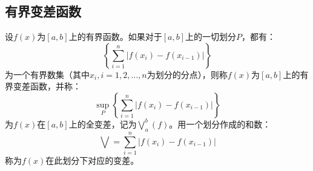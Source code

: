 \subsection{有界变差函数}
\begin{definition}
	设$f(x)$为$[a,b]$上的有界函数。如果对于$[a,b]$上的一切划分$P$，都有：
	\begin{equation*}
		\left\{\sum_{i=1}^{n}|f(x_i)-f(x_{i-1})|\right\}
	\end{equation*}
	为一个有界数集（其中$x_i,i=1,2,\dots,n$为划分的分点），则称$f(x)$为$[a,b]$上的有界变差函数，并称：
	\begin{equation*}
		\sup_P\left\{\sum_{i=1}^{n}|f(x_i)-f(x_{i-1})|\right\}
	\end{equation*}
	为$f(x)$在$[a,b]$上的全变差，记为$\bigvee_a^b(f)$。用一个划分作成的和数：
	\begin{equation*}
		\bigvee=\sum_{i=1}^{n}|f(x_i)-f(x_{i-1})|
	\end{equation*}
	称为$f(x)$在此划分下对应的变差。
\end{definition}
